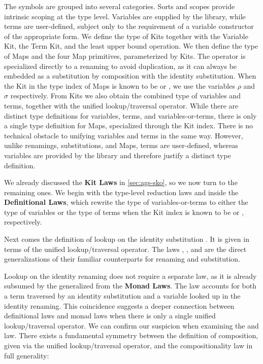 \documentclass[screen,nonacm]{acmart}
\begin{document}
The symbols are grouped into several categories. Sorts and scopes provide
intrinsic scoping at the type level. Variables are supplied by the library,
while terms are user-defined, subject only to the requirement of a variable
constructor of the appropriate form. We define the type of Kits together with
the Variable Kit, the Term Kit, and the least upper bound operation. We then
define the type of Maps and the four Map primitives, parameterized by Kits. The
operator  is specialized directly to a renaming to avoid
duplication, as it can always be embedded as a substitution by composition with
the identity substitution. When the Kit in the type index of Maps is known to
be  or , we use the variables $ρ$ and $σ$
respectively. From Kits we also obtain the combined type of variables and
terms, together with the unified lookup/traversal operator. While there are
distinct type definitions for variables, terms, and variables-or-terms, there
is only a single type definition for Maps, specialized through the Kit index.
There is no technical obstacle to unifying variables and terms in the same way.
However, unlike renamings, substitutions, and Maps, terms are user-defined,
whereas variables are provided by the library and therefore justify a distinct
type definition.

We already discussed the \textbf{Kit Laws} in \cref{sec:ags-sko}, so we now
turn to the remaining ones. We begin with the type-level reduction laws
 and  inside the \textbf{Definitional
      Laws}, which rewrite the type of variables-or-terms to either the type of
variables or the type of terms when the Kit index is known to be
 or , respectively.

Next comes the definition of lookup on the identity substitution
. It is given in terms of the unified lookup/traversal
operator. The laws , , and
 are the direct generalizations of their familiar
counterparts for renaming and substitution.

Lookup on the identity renaming does not require a separate law, as it is
already subsumed by the generalized  from the \textbf{Monad
      Laws}. The  law accounts for both a term traversed by an
identity substitution and a variable looked up in the identity renaming. This
coincidence suggests a deeper connection between definitional laws and monad
laws when there is only a single unified lookup/traversal operator. We can
confirm our suspicion when examining the  and
 law. There exists a fundamental symmetry between
the definition of composition, given via the unified lookup/traversal operator,
and the compositionality law in full generality:
\end{document}
